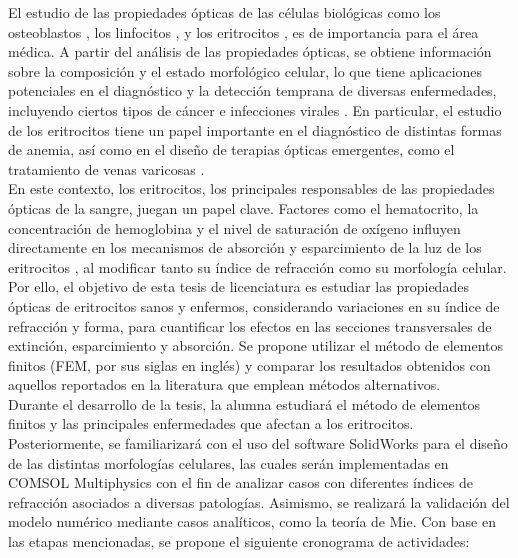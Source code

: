 \documentclass[11pt,letterpaper]{article}
\begin{document}
	El estudio de las propiedades ópticas de las células biológicas como los osteoblastos \cite{Osteoblastos}, los linfocitos \cite{Linfocitos}, y los eritrocitos \cite{Blood}, es de importancia para el área médica. A partir del análisis de las propiedades ópticas, se obtiene información sobre la composición y el estado morfológico celular, lo que tiene aplicaciones potenciales en el diagnóstico y la detección temprana de diversas enfermedades, incluyendo ciertos tipos de cáncer e infecciones virales \cite{Linfocitos}. En particular, el estudio de los eritrocitos tiene un papel importante en el diagnóstico de distintas formas de anemia, así como en el diseño de terapias ópticas emergentes, como el tratamiento de venas varicosas \cite{Blood}. \\
	
	En este contexto, los eritrocitos, los principales responsables de las propiedades ópticas de la sangre, juegan un papel clave. Factores como el hematocrito, la concentración de hemoglobina y el nivel de saturación de oxígeno influyen directamente en los mecanismos de absorción y esparcimiento de la luz de los eritrocitos \cite{Blood}, al modificar tanto su índice de refracción como su morfología celular. Por ello, el objetivo de esta tesis de licenciatura es estudiar las propiedades ópticas de eritrocitos sanos y enfermos, considerando variaciones en su índice de refracción y forma, para cuantificar los efectos en las secciones transversales de extinción, esparcimiento y absorción. Se propone utilizar el método de elementos finitos (FEM, por sus siglas en inglés) y comparar los resultados obtenidos con aquellos reportados en la literatura que emplean métodos alternativos.\\
	
	Durante el desarrollo de la tesis, la alumna estudiará el método de elementos finitos y las principales enfermedades que afectan a los eritrocitos. Posteriormente, se familiarizará con el uso del software SolidWorks para el diseño de las distintas morfologías celulares, las cuales serán implementadas en COMSOL Multiphysics con el fin de analizar casos con diferentes índices de refracción asociados a diversas patologías. Asimismo, se realizará la validación del modelo numérico mediante casos analíticos, como la teoría de Mie. Con base en las etapas mencionadas, se propone el siguiente cronograma de actividades:
	
\end{document}
